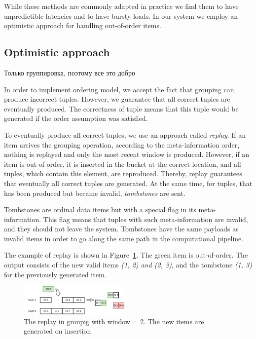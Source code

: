 While these methods are commonly adapted in practice we find them to have unpredictible latencies and to have bursty loads. In our system we employ an optimistic approach for handling out-of-order items.

\subsection{Optimistic approach}

Только группировка, поэтому все это добро

In order to implement ordering model, we accept the fact that grouping can produce incorrect tuples. However, we guarantee that all correct tuples are eventually produced. The correctness of tuple means that this tuple would be generated if the order assumption was satisfied. 

To eventually produce all correct tuples, we use an approach called {\it replay}. If an item arrives the grouping operation, according to the meta-information order, nothing is replayed and only the most recent window is produced. However, if an item is out-of-order, it is inserted in the bucket at the correct location, and all tuples, which contain this element, are reproduced. Thereby, replay guarantees that eventually all correct tuples are generated. At the same time, for tuples, that has been produced but became invalid, {\it tombstones} are sent.

Tombstones are ordinal data items but with a special flag in its meta-information. This flag means that tuples with such meta-information are invalid, and they should not leave the system. Tombstones have the same payloads as invalid items in order to go along the same path in the computational pipeline.

The example of replay is shown in Figure~\ref{grouping-replaying}, The green item is out-of-order. The output consists of the new valid items {\it (1, 2) and (2, 3)}, and the tombstone {\it (1, 3)} for the previously generated item.

\begin{figure}[htbp]
  \centering
  \includegraphics[width=0.48\textwidth]{pics/grouping-replaying}
  \caption{The replay in groupig with window = 2. The new items are generated on insertion}
  \label {grouping-replaying}
\end{figure}

